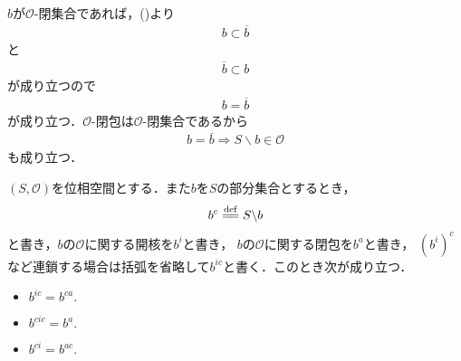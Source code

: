 	\begin{sketch}
		$b$が$\mathscr{O}$-閉集合であれば，()より
		\begin{align}
			b \subset \overline{b}
		\end{align}
		と
		\begin{align}
			\overline{b} \subset b
		\end{align}
		が成り立つので
		\begin{align}
			b = \overline{b}
		\end{align}
		が成り立つ．$\mathscr{O}$-閉包は$\mathscr{O}$-閉集合であるから
		\begin{align}
			b = \overline{b} \Longrightarrow S \backslash b \in \mathscr{O}
		\end{align}
		も成り立つ．
		\QED
	\end{sketch}
	
	\begin{screen}
		\begin{thm}[開核の補集合は補集合の閉包]
		\label{thm:topology_note_closure_interior}
			$(S,\mathscr{O})$を位相空間とする．また$b$を$S$の部分集合とするとき，
			\begin{align}
				b^c \defeq S \backslash b
			\end{align}
			と書き，$b$の$\mathscr{O}$に関する開核を$b^i$と書き，
			$b$の$\mathscr{O}$に関する閉包を$b^a$と書き，
			$(b^i)^c$など連鎖する場合は括弧を省略して$b^{ic}$と書く．このとき次が成り立つ．
			\begin{itemize}
				\item $b^{ic} = b^{ca}.$
				\item $b^{cic} = b^a.$
				\item $b^{ci} = b^{ac}.$
			\end{itemize}
		\end{thm}
	\end{screen}
	
